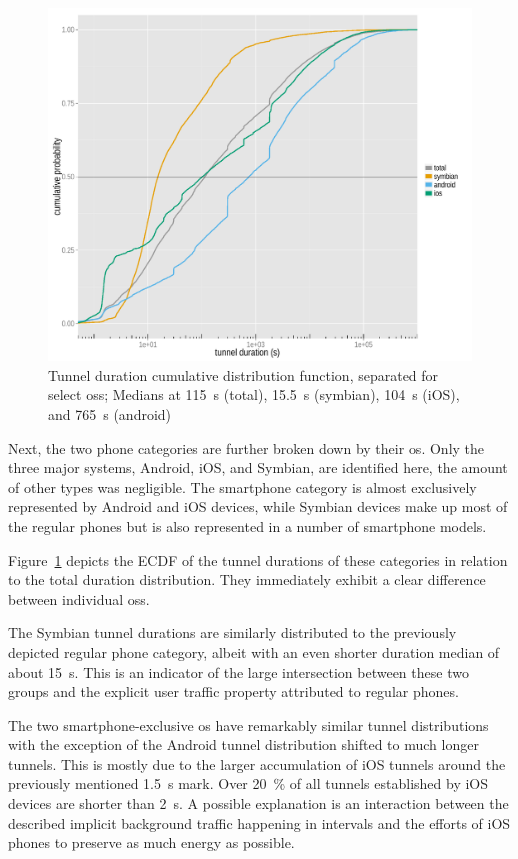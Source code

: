 \begin{figure}[htb]
	\centering
	\includegraphics[width=1.0\textwidth]{images/R-tunnel-duration-operating-system.pdf}
	\caption{Tunnel duration cumulative distribution function, separated for select \glspl{os}; Medians at \SI{115}{\second} (total), \SI{15.5}{\second} (symbian), \SI{104}{\second} (iOS), and \SI{765}{\second} (android)}
\label{c4:fig:cdf-duration-os}
\end{figure}

Next, the two phone categories are further broken down by their \gls{os}. Only the three major systems, Android, iOS, and Symbian, are identified here, the amount of other types was negligible. The smartphone category is almost exclusively represented by Android and iOS devices, while Symbian devices make up most of the regular phones but is also represented in a number of smartphone models.

Figure~\ref{c4:fig:cdf-duration-os} depicts the \gls{ECDF} of the tunnel durations of these categories in relation to the total duration distribution. They immediately exhibit a clear difference between individual \glspl{os}.

The Symbian tunnel durations are similarly distributed to the previously depicted regular phone category, albeit with an even shorter duration median of about \SI{15}{\second}. This is an indicator of the large intersection between these two groups and the explicit user traffic property attributed to regular phones.

The two smartphone-exclusive \gls{os} have remarkably similar tunnel distributions with the exception of the Android tunnel distribution shifted to much longer tunnels. This is mostly due to the larger accumulation of iOS tunnels around the previously mentioned \SI{1.5}{\second} mark. Over \SI{20}{\percent} of all tunnels established by iOS devices are shorter than \SI{2}{\second}. A possible explanation is an interaction between the described implicit background traffic happening in intervals and the efforts of iOS phones to preserve as much energy as possible. 

